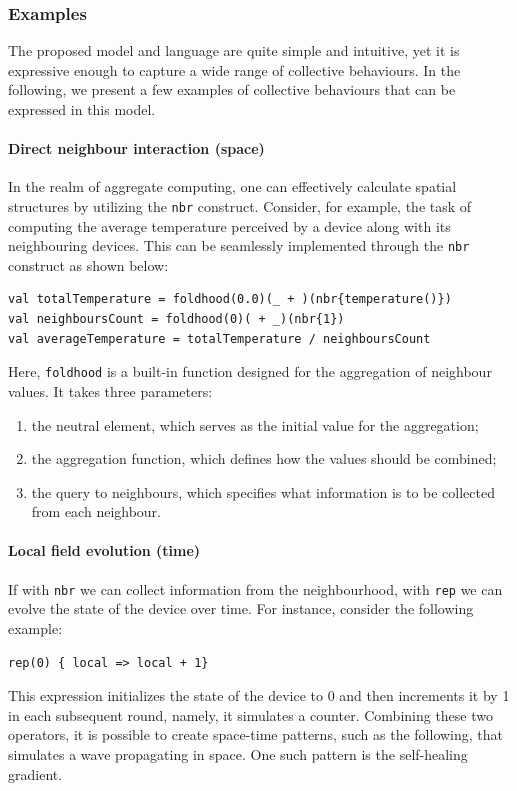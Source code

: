 \subsubsection{Examples}
\label{sec:field-calculus-foundational-behaviour}
The proposed model and language are quite simple and intuitive, 
 yet it is expressive enough to capture a wide range of collective behaviours.
In the following, we present a few examples of collective behaviours that can be expressed in this model.
\paragraph*{Direct neighbour interaction (space)}
In the realm of aggregate computing, 
 one can effectively calculate spatial structures by utilizing the \texttt{nbr} construct. 
 Consider, for example, the task of computing the average temperature perceived by a device along with its neighbouring devices. 
 This can be seamlessly implemented through the \texttt{nbr} construct as shown below:
\begin{lstlisting}[language=scafi]
val totalTemperature = foldhood(0.0)(_ + )(nbr{temperature()})
val neighboursCount = foldhood(0)( + _)(nbr{1})
val averageTemperature = totalTemperature / neighboursCount
\end{lstlisting}
Here, \texttt{foldhood} is a built-in function designed for the aggregation of neighbour values. 
It takes three parameters:
\begin{enumerate}
\item the neutral element, which serves as the initial value for the aggregation;
\item the aggregation function, which defines how the values should be combined;
\item the query to neighbours, which specifies what information is to be collected from each neighbour.
\end{enumerate} 
\paragraph*{Local field evolution (time)}
If with \texttt{nbr} we can collect information from the neighbourhood, 
 with \texttt{rep} we can evolve the state of the device over time. 
 For instance, consider the following example:
\begin{lstlisting}[language=scafi]
rep(0) { local => local + 1}
\end{lstlisting}
This expression initializes the state of the device to 0 and then increments it by 1 in each subsequent round, namely, it simulates a counter.
Combining these two operators, it is possible to create space-time patterns, 
 such as the following, that simulates a wave propagating in space.
 One such pattern is the self-healing gradient.
